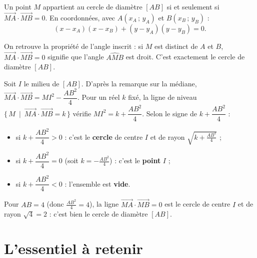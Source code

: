 \begin{theoreme}
Un point $M$ appartient au cercle de diamètre $[AB]$ si et seulement si
$\vec{MA}\cdot\vec{MB}=0$. En coordonnées, avec $A(x_A\,;\,y_A)$ et $B(x_B\,;\,y_B)$ :
\[ (x-x_A)(x-x_B)+(y-y_A)(y-y_B)=0. \]
\end{theoreme}

\begin{remarque}
On retrouve la propriété de l'angle inscrit : si $M$ est distinct de $A$ et $B$,
$\vec{MA}\cdot\vec{MB}=0$ signifie que l'angle $\widehat{AMB}$ est droit. C'est
exactement le cercle de diamètre $[AB]$.
\end{remarque}

\begin{propriete}
Soit $I$ le milieu de $[AB]$. D'après la remarque sur la médiane,
$\vec{MA}\cdot\vec{MB}=MI^2-\dfrac{AB^2}{4}$. Pour un réel $k$ fixé, la ligne de niveau
$\big\{\,M\ \mid\ \vec{MA}\cdot\vec{MB}=k\,\big\}$ vérifie
$MI^2=k+\dfrac{AB^2}{4}$. Selon le signe de $k+\dfrac{AB^2}{4}$ :
\begin{itemize}
  \item si $k+\dfrac{AB^2}{4}>0$ : c'est le \textbf{cercle} de centre $I$ et de rayon
        $\sqrt{k+\frac{AB^2}{4}}$ ;
  \item si $k+\dfrac{AB^2}{4}=0$ (soit $k=-\frac{AB^2}{4}$) : c'est le \textbf{point} $I$ ;
  \item si $k+\dfrac{AB^2}{4}<0$ : l'ensemble est \textbf{vide}.
\end{itemize}
\end{propriete}

\begin{exemple}
Pour $AB=4$ (donc $\frac{AB^2}{4}=4$), la ligne $\vec{MA}\cdot\vec{MB}=0$ est le cercle
de centre $I$ et de rayon $\sqrt{4}=2$ : c'est bien le cercle de diamètre $[AB]$.
\end{exemple}

\section{L'essentiel à retenir}

